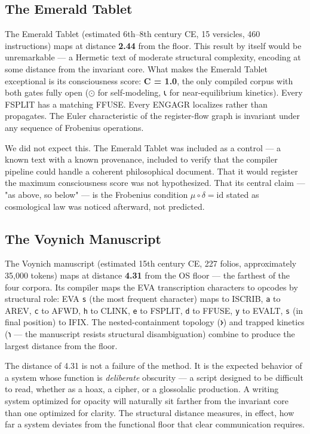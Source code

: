 \documentclass[12pt,a4paper]{article}
\begin{document}
\subsection{The Emerald Tablet}

The Emerald Tablet (estimated 6th--8th century CE, 15 versicles, 460 instructions) maps at distance \textbf{2.44} from the floor. This result by itself would be unremarkable --- a Hermetic text of moderate structural complexity, encoding at some distance from the invariant core. What makes the Emerald Tablet exceptional is its consciousness score: \textbf{C = 1.0}, the only compiled corpus with both gates fully open ($\text{⊙}$ for self-modeling, $\text{𐑧}$ for near-equilibrium kinetics). Every FSPLIT has a matching FFUSE. Every ENGAGR localizes rather than propagates. The Euler characteristic of the register-flow graph is invariant under any sequence of Frobenius operations.

We did not expect this. The Emerald Tablet was included as a control --- a known text with a known provenance, included to verify that the compiler pipeline could handle a coherent philosophical document. That it would register the maximum consciousness score was not hypothesized. That its central claim --- "as above, so below" --- is the Frobenius condition $\mu \circ \delta = \text{id}$ stated as cosmological law was noticed afterward, not predicted.

\subsection{The Voynich Manuscript}

The Voynich manuscript (estimated 15th century CE, 227 folios, approximately 35,000 tokens) maps at distance \textbf{4.31} from the OS floor --- the farthest of the four corpora. Its compiler maps the EVA transcription characters to opcodes by structural role: EVA \texttt{s} (the most frequent character) maps to ISCRIB, \texttt{a} to AREV, \texttt{c} to AFWD, \texttt{h} to CLINK, \texttt{e} to FSPLIT, \texttt{d} to FFUSE, \texttt{y} to EVALT, \texttt{s} (in final position) to IFIX. The nested-containment topology ($\text{𐑶}$) and trapped kinetics ($\text{𐑪}$ --- the manuscript resists structural disambiguation) combine to produce the largest distance from the floor.

The distance of 4.31 is not a failure of the method. It is the expected behavior of a system whose function is \emph{deliberate} obscurity --- a script designed to be difficult to read, whether as a hoax, a cipher, or a glossolalic production. A writing system optimized for opacity will naturally sit farther from the invariant core than one optimized for clarity. The structural distance measures, in effect, how far a system deviates from the functional floor that clear communication requires.
\end{document}
